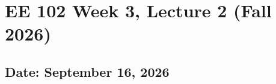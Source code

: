 \documentclass{ee102_notes}
\renewcommand{\releasedate}{September 16, 2026}
\begin{document}
\section*{EE 102 Week 3, Lecture 2 (Fall 2026)}
\subsection*{Date: \releasedate}
\tableofcontents

\end{document}
